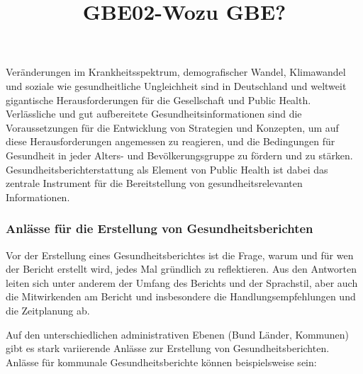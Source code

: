 \documentclass{article}
\begin{document}
\title{GBE02-Wozu GBE?}

\maketitle


Veränderungen im Krankheitsspektrum, demografischer Wandel, Klimawandel und soziale wie gesundheitliche Ungleichheit sind in Deutschland und weltweit gigantische Herausforderungen für die Gesellschaft und Public Health. Verlässliche und gut aufbereitete Gesundheitsinformationen sind die Voraussetzungen für die Entwicklung von Strategien und Konzepten, um auf diese Herausforderungen angemessen zu reagieren, und die Bedingungen für Gesundheit in jeder Alters- und Bevölkerungsgruppe zu fördern und zu stärken. Gesundheitsberichterstattung als Element von Public Health ist dabei das zentrale Instrument für die Bereitstellung von gesundheitsrelevanten Informationen. 


\subsubsection{Anlässe für die Erstellung von Gesundheitsberichten}\label{H6562084}



Vor der Erstellung eines Gesundheitsberichtes ist die Frage, warum und für wen der Bericht erstellt wird, jedes Mal gründlich zu reflektieren. Aus den Antworten leiten sich unter anderem der Umfang des Berichts und der Sprachstil, aber auch die Mitwirkenden am Bericht und insbesondere die Handlungsempfehlungen und die Zeitplanung ab.


Auf den unterschiedlichen administrativen Ebenen (Bund Länder, Kommunen) gibt es stark variierende Anlässe zur Erstellung von Gesundheitsberichten. Anlässe für kommunale Gesundheitsberichte können beispielsweise sein: 
\end{document}
